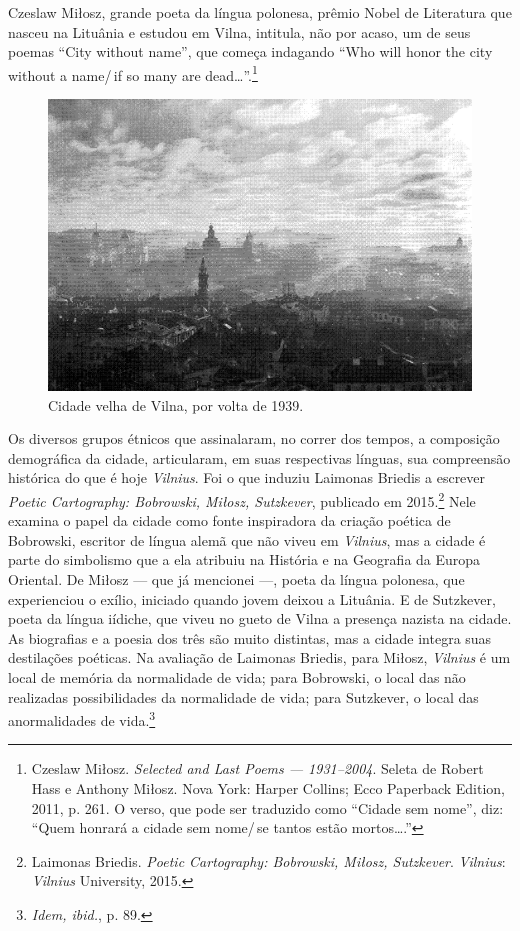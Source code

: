Czeslaw Miłosz, grande poeta da língua polonesa, prêmio Nobel de
Literatura que nasceu na Lituânia e estudou em Vilna, intitula, não por
acaso, um de seus poemas ``City without name'', que começa indagando
``Who will honor the city without a name/\,if so many are
dead\ldots{}''.\footnote{Czeslaw Miłosz. \textit{Selected and Last Poems ---
  1931--2004}. Seleta de Robert Hass e Anthony Miłosz. Nova York: Harper
  Collins; Ecco Paperback Edition, 2011, p. 261. O verso, que pode ser traduzido como ``Cidade sem nome'', 
  diz: ``Quem honrará a cidade sem nome/\,se tantos estão mortos\dots{}.''}

\begin{figure}[!ht]
    \centering
    \includegraphics[width=\textwidth]{ilustra-01.png}
    \caption{Cidade velha de Vilna, por volta de 1939.}
\end{figure}

Os diversos grupos étnicos que assinalaram, no correr dos tempos, a
composição demográfica da cidade, articularam, em suas respectivas
línguas, sua compreensão histórica do que é hoje \textit{Vilnius}. Foi o que
induziu Laimonas Briedis a escrever \textit{Poetic Cartography:
 Bobrowski, Miłosz, Sutzkever}, publicado em 2015.\footnote{Laimonas Briedis.
  \textit{Poetic Cartography: Bobrowski, Miłosz, Sutzkever}. \textit{Vilnius}: \textit{Vilnius} University, 2015.} Nele examina
o papel da cidade como fonte inspiradora da criação poética de Bobrowski, escritor de língua alemã que não viveu em \textit{Vilnius}, mas a cidade é
parte do simbolismo que a ela atribuiu na História e na Geografia da
Europa Oriental. De Miłosz --- que já mencionei ---, poeta da língua
polonesa, que experienciou o exílio, iniciado quando jovem deixou a
Lituânia. E de Sutzkever, poeta da língua iídiche, que viveu no gueto de
Vilna a presença nazista na cidade. As biografias e a poesia dos três
são muito distintas, mas a cidade integra suas destilações poéticas. Na
avaliação de Laimonas Briedis, para Miłosz, \textit{Vilnius} é um local de
memória da normalidade de vida; para Bobrowski, o local das não
realizadas possibilidades da normalidade de vida; para Sutzkever, o
local das anormalidades de vida.\footnote{\textit{Idem, ibid.}, p. 89.}

